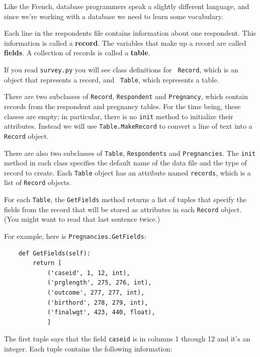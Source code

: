 \documentclass[12pt]{book}
\begin{document}
Like the French, database programmers speak a slightly
different language, and since we're working with a database we need
to learn some vocabulary.

Each line in the respondents file contains information about one
respondent.  This information is called a {\bf record}.  The
variables that make up a record are called {\bf fields}.  A
collection of records is called a {\bf table}.

If you read {\tt survey.py} you will see class definitions for {\tt
  Record}, which is an object that represents a record, and {\tt
  Table}, which represents a table.

There are two subclasses of
{\tt Record}, {\tt Respondent} and {\tt Pregnancy}, which
contain records from the respondent and pregnancy tables.
For the time being, these classes are empty; in particular, there
is no {\tt init} method to initialize their attributes.  Instead
we will use {\tt Table.MakeRecord} to convert a line of text into
a {\tt Record} object.

There are also two subclasses of {\tt Table}, {\tt Respondents}
and {\tt Pregnancies}.  The {\tt init} method in each class
specifies the default name of the data file and the type of
record to create.  Each {\tt Table} object has an attribute
named {\tt records}, which is a list of {\tt Record} objects.

For each {\tt Table}, the {\tt GetFields} method returns
a list of tuples that specify the fields from the record that
will be stored as attributes in each {\tt Record} object.  (You
might want to read that last sentence twice.)

For example, here is {\tt Pregnancies.GetFields}:

\begin{verbatim}
    def GetFields(self):
        return [
            ('caseid', 1, 12, int),
            ('prglength', 275, 276, int),
            ('outcome', 277, 277, int),
            ('birthord', 278, 279, int),
            ('finalwgt', 423, 440, float),
            ]
\end{verbatim}

The first tuple says that the field {\tt caseid} is in columns
1 through 12 and it's an integer.  Each tuple contains the following
information:
\end{document}
